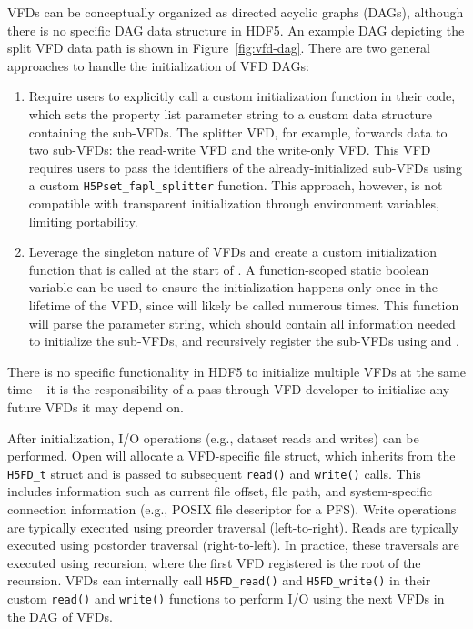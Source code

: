 VFDs can be conceptually organized as directed acyclic graphs (DAGs), although there is no specific DAG data structure in HDF5. An example DAG depicting the split VFD data path is shown in Figure~\ref{fig:vfd-dag}. There are two general approaches to handle the initialization of VFD DAGs:
\begin{enumerate}
    \item Require users to explicitly call a custom initialization function in their code, which sets the property list parameter string to a custom data structure containing the sub-VFDs. The splitter VFD, for example, forwards data to two sub-VFDs: the read-write VFD and the write-only VFD. This VFD requires users to pass the identifiers of the already-initialized sub-VFDs using a custom \texttt{H5Pset\_fapl\_splitter} function. This approach, however, is not compatible with transparent initialization through environment variables, limiting portability.
    \item Leverage the singleton nature of VFDs and create a custom initialization function that is called at the start of . A function-scoped static boolean variable can be used to ensure the initialization happens only once in the lifetime of the VFD, since  will likely be called numerous times. This function will parse the parameter string, which should contain all information needed to initialize the sub-VFDs, and recursively register the sub-VFDs using  and .
\end{enumerate}
There is no specific functionality in HDF5 to initialize multiple VFDs at the same time -- it is the responsibility of a pass-through VFD developer to initialize any future VFDs it may depend on.

After initialization, I/O operations (e.g., dataset reads and writes) can be performed. Open will allocate a VFD-specific file struct, which inherits from the \texttt{H5FD\_t} struct and is passed to subsequent \texttt{read()} and \texttt{write()} calls. This includes information such as current file offset, file path, and system-specific connection information (e.g., POSIX file descriptor for a PFS). Write operations are typically executed using preorder traversal (left-to-right). Reads are typically executed using postorder traversal (right-to-left). In practice, these traversals are executed using recursion, where the first VFD registered is the root of the recursion. VFDs can internally call \texttt{H5FD_read()} and \texttt{H5FD_write()} in their custom \texttt{read()} and \texttt{write()} functions to perform I/O using the next VFDs in the DAG of VFDs.

